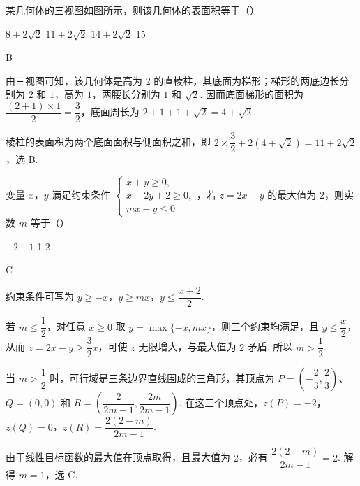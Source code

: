 \begin{problem}
某几何体的三视图如图所示，则该几何体的表面积等于（\quad）


\choices
    {\(8 + 2\sqrt{2}\)}
    {\(11 + 2\sqrt{2}\)}
    {\(14 + 2\sqrt{2}\)}
    {15}
\end{problem}

\begin{answer}
B
\end{answer}

\begin{solution}
由三视图可知，该几何体是高为 \(2\) 的直棱柱，其底面为梯形；梯形的两底边长分别为 \(2\) 和 \(1\)，高为 \(1\)，两腰长分别为 \(1\) 和 \(\sqrt2\). 因而底面梯形的面积为 \(\dfrac{(2+1)\times1}{2}=\dfrac32\)，底面周长为 \(2+1+1+\sqrt2=4+\sqrt2\).

棱柱的表面积为两个底面面积与侧面积之和，即 \(2\times\dfrac32+2(4+\sqrt2)=11+2\sqrt2\)，选 B.
\end{solution}

\begin{problem}
变量 \(x\)，\(y\) 满足约束条件 \(\begin{cases}
x + y \geqslant 0,\\
x - 2y + 2 \geqslant 0,\\
mx - y \leqslant 0
\end{cases}\)，若 \(z = 2x - y\) 的最大值为 2，则实数 \(m\) 等于（\quad）

\choices
    {\(-2\)}
    {\(-1\)}
    {1}
    {2}
\end{problem}

\begin{answer}
C
\end{answer}

\begin{solution}
约束条件可写为 \(y\geqslant-x\)，\(y\geqslant mx\)，\(y\leqslant\dfrac{x+2}{2}\).

若 \(m\leqslant\dfrac12\)，对任意 \(x\geqslant0\) 取 \(y=\max\{-x,mx\}\)，则三个约束均满足，且 \(y\leqslant\dfrac{x}{2}\)，从而 \(z=2x-y\geqslant\dfrac32x\)，可使 \(z\) 无限增大，与最大值为 \(2\) 矛盾. 所以 \(m>\dfrac12\).

当 \(m>\dfrac12\) 时，可行域是三条边界直线围成的三角形，其顶点为 \(P=\left(-\dfrac23,\dfrac23\right)\)、\(Q=(0,0)\) 和 \(R=\left(\dfrac{2}{2m-1},\dfrac{2m}{2m-1}\right)\). 在这三个顶点处，\(z(P)=-2\)，\(z(Q)=0\)，\(z(R)=\dfrac{2(2-m)}{2m-1}\).

由于线性目标函数的最大值在顶点取得，且最大值为 \(2\)，必有 \(\dfrac{2(2-m)}{2m-1}=2\). 解得 \(m=1\)，选 C.
\end{solution}

